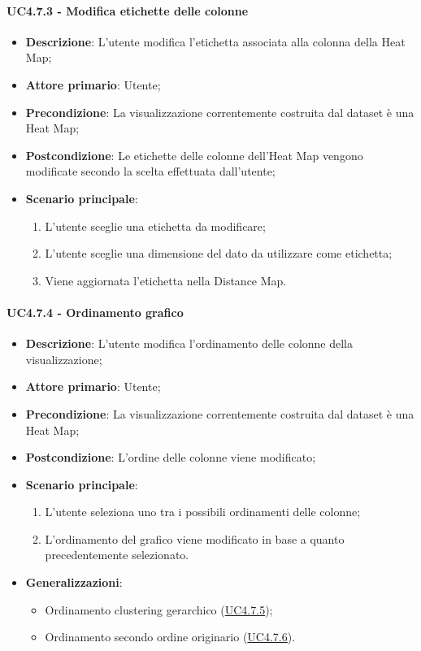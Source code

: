 \paragraph{UC4.7.3 - Modifica etichette delle colonne}
\label{par:uc4.7.4}
\begin{itemize}
    \item \textbf{Descrizione}:     L'utente modifica l'etichetta associata alla colonna della Heat Map;
    \item \textbf{Attore primario}: Utente;
    \item \textbf{Precondizione}:   La visualizzazione correntemente costruita dal dataset è una Heat Map;
    \item \textbf{Postcondizione}:  Le etichette delle colonne dell'Heat Map vengono modificate secondo la scelta effettuata dall'utente;
    \item \textbf{Scenario principale}:
    \begin{enumerate}
        \item L'utente sceglie una etichetta da modificare;
        \item L'utente sceglie una dimensione del dato da utilizzare come etichetta;
        \item Viene aggiornata l'etichetta nella Distance Map.
    \end{enumerate}
\end{itemize}

\paragraph{UC4.7.4 - Ordinamento grafico}
\label{par:uc4.7.5}
\begin{itemize}
    \item \textbf{Descrizione}:     L'utente modifica l'ordinamento delle colonne della visualizzazione;
    \item \textbf{Attore primario}: Utente;
    \item \textbf{Precondizione}:   La visualizzazione correntemente costruita dal dataset è una Heat Map;
    \item \textbf{Postcondizione}:  L'ordine delle colonne viene modificato;
    \item \textbf{Scenario principale}:
    \begin{enumerate}
        \item L'utente seleziona uno tra i possibili ordinamenti delle colonne;
        \item L'ordinamento del grafico viene modificato in base a quanto precedentemente selezionato.
    \end{enumerate}
    \item \textbf{Generalizzazioni}:
    \begin{itemize}
        \item Ordinamento clustering gerarchico (\hyperref[spar:uc4.7.5.6]{UC4.7.5});
        \item Ordinamento secondo ordine originario (\hyperref[spar:uc4.7.5.7]{UC4.7.6}).
    \end{itemize}
\end{itemize}

